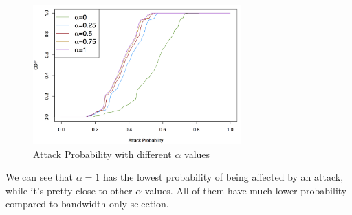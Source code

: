 \begin{figure}[ht!]
\centering
\includegraphics[width=80mm]{figure/attack}
\caption{Attack Probability with different $\alpha$ values \label{fig_attack}}
\end{figure}

We can see that $\alpha=1$ has the lowest probability of being affected by an attack, while it's pretty close to other $\alpha$ values. All of them have much lower probability compared to bandwidth-only selection. 

